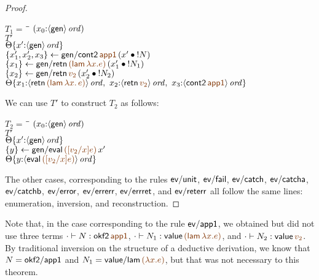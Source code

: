 \begin{proof}
\begin{description}
\begin{tabbing}
$T_1 = ~$ \= \qquad \= $(x_0{:}{\langle {\sf gen} \rangle}\,{{\it ord}})$
\\
\>$T'$
\\
\>\>${\Theta}\{{x'{:}{\langle {\sf gen} \rangle}\,{{\it ord}}}\}$
\\
\>$\trstep{x_1', x_2', x_3}
     {{\sf gen/cont2}\,\lf{\sf app1}\,(\tfuser{x'}{\tbangr{N}})}$
\\
\>$\trstep{x_1}
     {{\sf gen/retn}\,\lf{({\sf lam}\,\lambda x.e)}\,
        (\tfuser{x_1'}{\tbangr{N_1}})}$ 
\\
\>$\trstep{x_2}
     {{\sf gen/retn}\,\lf{v_2}\,(\tfuser{x_2'}{\tbangr{N_2}})}$
\\
\>\>$\tackon{\Theta}{x_1{:}\istrue{\susp{{\sf retn}\,\lf{({\sf lam}\,\lambda x.\,e)}}}, ~
                   x_2{:}\istrue{\susp{{\sf retn}\,\lf{v_2}}}, ~
                   x_3{:}\istrue{\susp{{\sf cont2}\,\lf{\sf app1}}}}$
\end{tabbing}

We can use $T'$ to construct $T_2$ as follows:
\begin{tabbing}
$T_2 = ~$ \= \qquad \= $(x_0{:}{\langle {\sf gen} \rangle}\,{{\it ord}})$
\\
\>$T'$
\\
\>\>${\Theta}\{{x'{:}{\langle {\sf gen} \rangle}\,{{\it ord}}}\}$
\\
\>$\trstep{y}
     {{\sf gen/eval}\,\lf{([v_2/x]e)}\,x'}$
\\
\>\>$\tackon{\Theta}{y{:}\istrue{\susp{{\sf eval}\,\lf{([v_2/x]e)}}}}$
\end{tabbing}


\end{description}

\noindent
The other cases, corresponding to the rules ${\sf ev/unit}$, ${\sf
  ev/fail}$, ${\sf ev/catch}$, ${\sf ev/catcha}$, ${\sf ev/catchb}$,
${\sf ev/error}$, ${\sf ev/errerr}$, ${\sf ev/errret}$, and ${\sf
  ev/reterr}$ all follow the same lines: enumeration, inversion, and
reconstruction. 
\end{proof}

Note that, in the case corresponding to the rule ${\sf ev/app1}$, we
obtained but did not use three terms $\cdot \vdash N : {{\sf
    okf2}\,\lf{\sf app1}}$, $\cdot \vdash N_1 : {\sf value}\,\lf{({\sf
    lam}\,\lambda x.e)}$, and $\cdot \vdash N_2 : {{\sf
    value}\,\lf{v_2}}$. By traditional inversion on the structure of a
deductive derivation, we know that $N = {\sf okf2/app1}$ and $N_1 =
{\sf value/lam}\,\lf{(\lambda x.e)}$, but that was not necessary to
this theorem.


